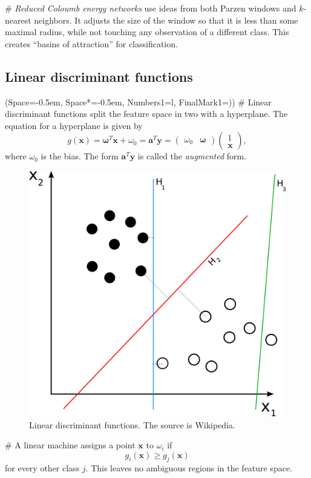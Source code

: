 \documentclass[12pt, a4paper]{article}
\newcommand{\listSpace}{-0.5em}%
\newcommand{\vect}[1]{\bm{#1}}
\begin{document}
\begin{easylist}[itemize]
# \emph{Reduced Coloumb energy networks} use ideas from both Parzen windows and $k$-nearest neighbors.
It adjusts the size of the window so that it is less than some maximal radius, while not touching any observation of a different class.
This creates ``basins of attraction'' for classification.
\end{easylist}



\subsection{Linear discriminant functions}
\begin{easylist}[itemize]
\ListProperties(Space=\listSpace, Space*=\listSpace, Numbers1=l, FinalMark1={)})
# Linear discriminant functions split the feature space in two with a hyperplane.
The equation for a hyperplane is given by
\begin{equation*}
	g(\vect{x}) = \vect{\omega}^T \vect{x} + \omega_0 = \vect{a}^T \vect{y} =
	\begin{pmatrix}
	\omega_0 & \vect{\omega}
	\end{pmatrix}
	\begin{pmatrix}
	1 \\
	\vect{x}
	\end{pmatrix},
\end{equation*}
where $\omega_0$ is the bias. 
The form $\vect{a}^T \vect{y}$ is called the \emph{augmented} form.

\begin{figure}[ht!]
	\centering
	\includegraphics[width=0.35\linewidth]{figs/separating_hyperplanes}
	\caption{Linear discriminant functions. The source is Wikipedia.}
	\label{fig:separating_hyperplanes}
\end{figure}

# A linear machine assigns a point $\vect{x}$ to $\omega_i$ if
\begin{equation*}
	g_i( \vect{x} ) \geq g_j( \vect{x} )
\end{equation*}
for every other class $j$.
This leaves no ambiguous regions in the feature space.


\end{easylist}
\end{document}
